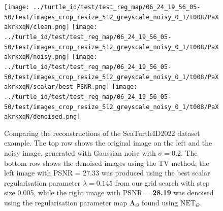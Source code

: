 \documentclass[12pt]{article}
\begin{document}
\begin{figure}[H]
    \centering
    \texttt{[image: ../turtle\_id/test/test\_reg\_map/06\_24\_19\_56\_05-50/test/images\_crop\_resize\_512\_greyscale\_noisy\_0\_1/t008/PaXakrkxqN/clean.png]}
    \texttt{[image: ../turtle\_id/test/test\_reg\_map/06\_24\_19\_56\_05-50/test/images\_crop\_resize\_512\_greyscale\_noisy\_0\_1/t008/PaXakrkxqN/noisy.png]}
    \texttt{[image: ../turtle\_id/test/test\_reg\_map/06\_24\_19\_56\_05-50/test/images\_crop\_resize\_512\_greyscale\_noisy\_0\_1/t008/PaXakrkxqN/scalar/best\_PSNR.png]}
    \texttt{[image: ../turtle\_id/test/test\_reg\_map/06\_24\_19\_56\_05-50/test/images\_crop\_resize\_512\_greyscale\_noisy\_0\_1/t008/PaXakrkxqN/denoised.png]}
    \caption{
        Comparing the reconstructions of the SeaTurtleID2022 dataset example.
        The top row shows the original image on the left and the noisy image, generated with Gaussian noise with $\sigma = 0.2$. 
        The bottom row shows the denoised images using the TV method; 
        the left image with PSNR = 27.33 was produced 
        using the best scalar regularisation parameter $\lambda = 0.145$ from our grid search with step size 0.005, 
        while the right image with PSNR = \textbf{28.19} was denoised 
        using the regularisation parameter map $\mathbf{\Lambda}_\Theta$ found using $\text{NET}_\Theta$.}
    \label{fig:compare_turtle_id}
\end{figure}
\end{document}
